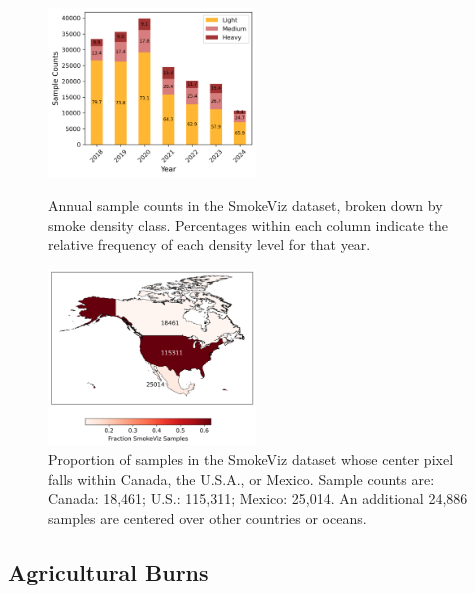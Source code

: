 \documentclass{article}
\begin{document}
\begin{figure}[!htb]
    \parbox{\textwidth}{
      \parbox{0.49\textwidth}{
        \centering
        \includegraphics[width=0.49\textwidth]{stat_figs/sample_count_per_yr_percentages.png}
        \caption{Annual sample counts in the SmokeViz dataset, broken down by smoke density class. Percentages within each column indicate the relative frequency of each density level for that year.}
        \label{count_per_yr}
      }
    \hspace{0.01\textwidth}
      \parbox{0.49\textwidth}{
        \centering
        \includegraphics[width=0.49\textwidth]{stat_figs/sample_percent_country.png}
        \caption{Proportion of samples in the SmokeViz dataset whose center pixel falls within Canada, the U.S.A., or Mexico. Sample counts are: Canada: 18,461; U.S.: 115,311; Mexico: 25,014. An additional 24,886 samples are centered over other countries or oceans.}
        \label{count_per_country}
      }
    }
\end{figure}

\subsection{Agricultural Burns}
\end{document}
